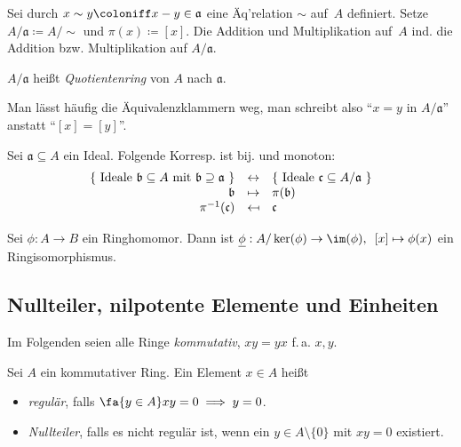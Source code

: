 \documentclass{cheat-sheet}
\newcommand{\aaa}{\mathfrak{a}}
\newcommand{\bbb}{\mathfrak{b}}
\newcommand{\ccc}{\mathfrak{c}}
\begin{document}
\begin{konstr}
  Sei durch $x \sim y \coloniff x - y \in \aaa$ eine Äq'relation $\sim$ auf~$A$ definiert.
  Setze $A/\aaa \coloneqq A/{\sim}$ und $\pi(x) \coloneqq [x]$.
  Die Addition und Multiplikation auf~$A$ ind. die Addition bzw. Multiplikation auf $A/\aaa$.
\end{konstr}

\begin{defn}
  $A/\aaa$ heißt \emph{Quotientenring} von $A$ nach $\aaa$.
\end{defn}

\begin{nota}
  Man lässt häufig die Äquivalenzklammern weg, man schreibt also
  "`$x = y$ in $A/\aaa$"' anstatt "`$[x] = [y]$"'.
\end{nota}

\begin{prop}
  Sei $\aaa \subseteq A$ ein Ideal.
  Folgende Korresp. ist bij. und monoton:
  \[
    \begin{array}{r c l}
      \{ \text{ Ideale $\bbb \subseteq A$ mit $\bbb \supseteq \aaa$ } \} & \leftrightarrow & \{ \text{ Ideale $\ccc \subseteq A/\aaa$ } \} \\
      \bbb & \mapsto & \pi(\bbb) \\
      \pi^{-1}(\ccc) & \mapsfrom & \ccc
    \end{array}
  \]
\end{prop}

\begin{samepage}

\begin{prop}
  Sei $\phi : A \to B$ ein Ringhomomor.
  Dann ist $\underline{\phi} : A / \ker(\phi) \to \im(\phi), \enspace [x] \mapsto \phi(x)$ ein Ringisomorphismus.
\end{prop}

\subsection{Nullteiler, nilpotente Elemente und Einheiten}

\end{samepage}


Im Folgenden seien alle Ringe \emph{kommutativ}, \dh{} $xy = yx$ f.\,a. $x, y$.

\begin{defn}
  Sei $A$ ein kommutativer Ring.
  Ein Element $x \in A$ heißt
  \begin{itemize}
    \item \emph{regulär}, falls $\fa{y \in A} xy = 0 \implies y = 0$.
    \item \emph{Nullteiler}, falls es nicht regulär ist, \dh{} wenn ein $y \in A \setminus \{ 0 \}$ mit $xy = 0$ existiert.
  \end{itemize}
\end{defn}
\end{document}

